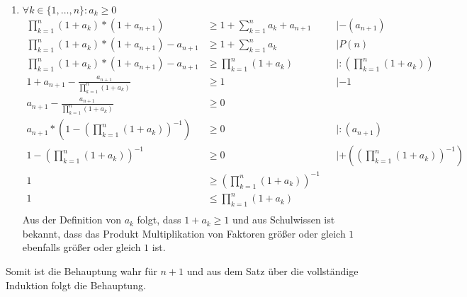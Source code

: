 \documentclass{article}
\begin{document}
\begin{enumerate}[label={Fall \arabic*}]
\newpage
\item $\forall k \in \{1, \ldots, n \} \colon a_k \geq 0$ \\  
\begin{align*}
 \prod\limits_{k = 1}^n (1 + a_k) * (1 + a_{n + 1})                   &\geq 1 + \sum\limits_{k = 1}^n a_k + a_{n + 1}  && | - (a_{n + 1}) \\
 \prod\limits_{k = 1}^n (1 + a_k) * (1 + a_{n + 1}) -  a_{n + 1}      &\geq 1 + \sum\limits_{k = 1}^n a_k              && | P(n) \\
 \prod\limits_{k = 1}^n (1 + a_k) * (1 + a_{n + 1}) -  a_{n + 1}      &\geq \prod\limits_{k = 1}^n (1 + a_k)           && | :(\prod\limits_{k = 1}^n (1 + a_k)) \\
  1 + a_{n + 1} -  \frac{a_{n + 1}}{\prod\limits_{k = 1}^n (1 + a_k)} &\geq 1                                          && | -1 \\
  a_{n + 1} -  \frac{a_{n + 1}}{\prod\limits_{k = 1}^n (1 + a_k)}     &\geq 0 \\
  a_{n + 1} * (1 - (\prod\limits_{k = 1}^n (1 + a_k))^{-1})           &\geq 0                                          && |: (a_{n + 1}) \\
  1 - (\prod\limits_{k = 1}^n (1 + a_k))^{-1}                         &\geq 0                                          && | + ((\prod\limits_{k = 1}^n (1 + a_k))^{-1}) \\
  1                                                                   &\geq (\prod\limits_{k = 1}^n (1 + a_k))^{-1}  \\
  1                                                                   &\leq \prod\limits_{k = 1}^n (1 + a_k) \\
\end{align*}
Aus der Definition von $a_k$ folgt, dass $1 + a_k \geq 1$ und aus Schulwissen ist bekannt, dass das Produkt Multiplikation von Faktoren größer
oder gleich $1$ ebenfalls größer oder gleich $1$ ist.
\end{enumerate}

\noindent
Somit ist die Behauptung wahr für $n + 1$ und aus dem Satz über die vollständige Induktion folgt die Behauptung.
\end{document}
